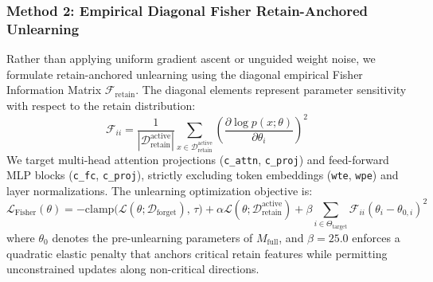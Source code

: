 \documentclass[11pt,a4paper]{article}
\begin{document}
\subsubsection{Method 2: Empirical Diagonal Fisher Retain-Anchored Unlearning}
Rather than applying uniform gradient ascent or unguided weight noise, we formulate retain-anchored unlearning using the diagonal empirical Fisher Information Matrix $\mathcal{F}_{\text{retain}}$. The diagonal elements represent parameter sensitivity with respect to the retain distribution:
\begin{equation}
\mathcal{F}_{ii} = \frac{1}{|\mathcal{D}_{\text{retain}}^{\text{active}}|} \sum_{x \in \mathcal{D}_{\text{retain}}^{\text{active}}} \left( \frac{\partial \log p(x; \theta)}{\partial \theta_i} \right)^2
\end{equation}
We target multi-head attention projections (\texttt{c\_attn}, \texttt{c\_proj}) and feed-forward MLP blocks (\texttt{c\_fc}, \texttt{c\_proj}), strictly excluding token embeddings (\texttt{wte}, \texttt{wpe}) and layer normalizations. The unlearning optimization objective is:
\begin{equation}
\mathcal{L}_{\text{Fisher}}(\theta) = -\text{clamp}\Big(\mathcal{L}(\theta; \mathcal{D}_{\text{forget}}), \, \tau\Big) + \alpha \mathcal{L}(\theta; \mathcal{D}_{\text{retain}}^{\text{active}}) + \beta \sum_{i \in \Theta_{\text{target}}} \mathcal{F}_{ii} (\theta_i - \theta_{0, i})^2
\end{equation}
where $\theta_0$ denotes the pre-unlearning parameters of $M_{\text{full}}$, and $\beta = 25.0$ enforces a quadratic elastic penalty that anchors critical retain features while permitting unconstrained updates along non-critical directions.
\end{document}

